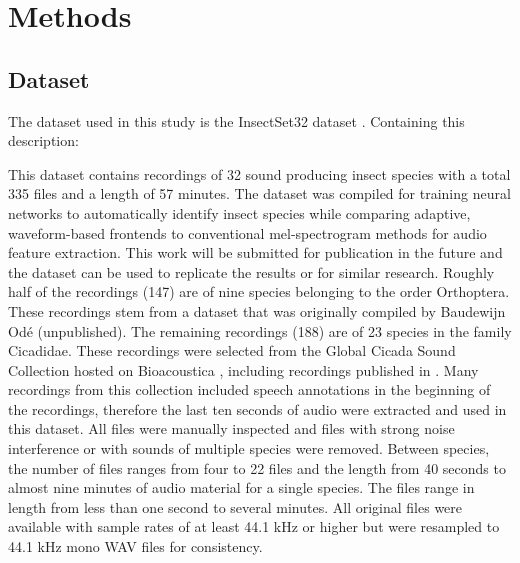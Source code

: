 

\section{Methods}
\label{methods}

\subsection{Dataset}

The dataset used in this study is the InsectSet32 dataset \autocite{faissInsectSet32DatasetAutomatic2022}. 
Containing this description:

\begin{displayquote}
This dataset contains recordings of 32 sound producing insect species with a total 335 files and a length of 57 minutes. 
The dataset was compiled for training neural networks to automatically identify insect species while comparing adaptive, 
waveform-based frontends to conventional mel-spectrogram methods for audio feature extraction. 
This work will be submitted for publication in the future and the dataset can be used to replicate the results or for similar research. 
Roughly half of the recordings (147) are of nine species belonging to the order Orthoptera. 
These recordings stem from a dataset that was originally compiled by Baudewijn Odé (unpublished). 
The remaining recordings (188) are of 23 species in the family Cicadidae. 
These recordings were selected from the Global Cicada Sound Collection hosted on Bioacoustica \autocite{bakerBioAcousticaFreeOpen2015}, 
including recordings published in \autocites{bakerGlobalCicadaSound2015}{poppleRevisionMyopsaltaCrucifera2017}.
Many recordings from this collection included speech annotations in the beginning of the recordings, 
therefore the last ten seconds of audio were extracted and used in this dataset. 
All files were manually inspected and files with strong noise interference or with sounds of multiple species were removed. 
Between species, the number of files ranges from four to 22 files and the length from 40 seconds to almost nine minutes of audio material for a single species. 
The files range in length from less than one second to several minutes. 
All original files were available with sample rates of at least 44.1 kHz or higher but were resampled to 44.1 kHz mono WAV files for consistency.
\end{displayquote}

